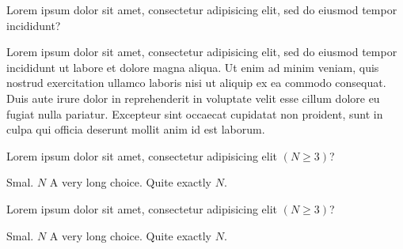 




\question 
{} %
Lorem ipsum dolor sit amet, consectetur adipisicing elit, sed do eiusmod tempor incididunt?
\begin{choices}
\CHOICE Lorem ipsum dolor sit amet, consectetur adipisicing elit, sed do eiusmod tempor incididunt ut labore et dolore magna aliqua.
\choice Ut enim ad minim veniam, quis nostrud exercitation ullamco laboris nisi ut aliquip ex ea commodo consequat.
\choice Duis aute irure dolor in reprehenderit in voluptate velit esse cillum dolore eu fugiat nulla pariatur.
\choice Excepteur sint occaecat cupidatat non proident, sunt in culpa qui officia deserunt mollit anim id est laborum.
\end{choices}



\question 
{}
Lorem ipsum dolor sit amet, consectetur adipisicing elit $(N \ge 3)$?
\\
\begin{oneparchoices}
\choice Smal.
\choice $N$
\CHOICE A very long choice.
\choice Quite exactly $N$.
\end{oneparchoices}



\question 
{}
Lorem ipsum dolor sit amet, consectetur adipisicing elit $(N \ge 3)$?
\begin{choices}[4]  %
\choice Smal.
\choice $N$
\CHOICE A very long choice.
\choice Quite exactly $N$.
\end{choices}




